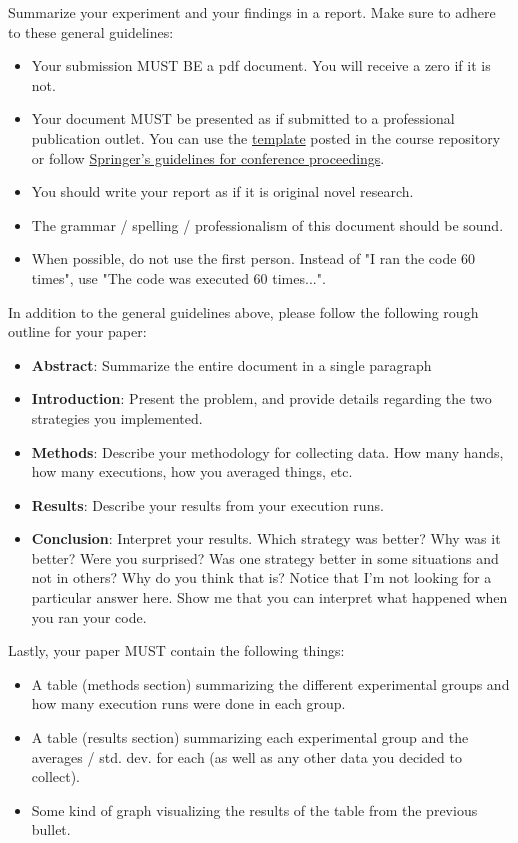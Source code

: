 \documentclass[paper=a4, fontsize=11pt, parskip=full]{scrartcl} %
\numberwithin{equation}{section} %
\numberwithin{figure}{section} %
\numberwithin{table}{section} %
\begin{document}
Summarize your experiment and your findings in a report. Make sure to adhere to these general guidelines:

\begin{itemize}
	\item Your submission MUST BE a pdf document. You will receive a zero if it is not.
	\item Your document MUST be presented as if submitted to a professional publication outlet. You can use the \href{https://github.com/markfloryan/dsa1}{template} posted in the course repository or follow \href{https://www.springer.com/us/computer-science/lncs/conference-proceedings-guidelines}{Springer's guidelines for conference proceedings}.
	\item You should write your report as if it is original novel research.
	\item The grammar / spelling / professionalism of this document should be sound.
	\item When possible, do not use the first person. Instead of "I ran the code 60 times", use "The code was executed 60 times...".
\end{itemize}

In addition to the general guidelines above, please follow the following rough outline for your paper:

\begin{itemize}
	\item \textbf{Abstract}: Summarize the entire document in a single paragraph
	\item \textbf{Introduction}: Present the problem, and provide details regarding the two strategies you implemented.
	\item \textbf{Methods}: Describe your methodology for collecting data. How many hands, how many executions, how you averaged things, etc.
	\item \textbf{Results}: Describe your results from your execution runs.
	\item \textbf{Conclusion}: Interpret your results. Which strategy was better? Why was it better? Were you surprised? Was one strategy better in some situations and not in others? Why do you think that is? Notice that I'm not looking for a particular answer here. Show me that you can interpret what happened when you ran your code.
\end{itemize}

Lastly, your paper MUST contain the following things:

\begin{itemize}
	\item A table (methods section) summarizing the different experimental groups and how many execution runs were done in each group.
	\item A table (results section) summarizing each experimental group and the averages / std. dev. for each (as well as any other data you decided to collect).
	\item Some kind of graph visualizing the results of the table from the previous bullet.
\end{itemize}


\end{document}
